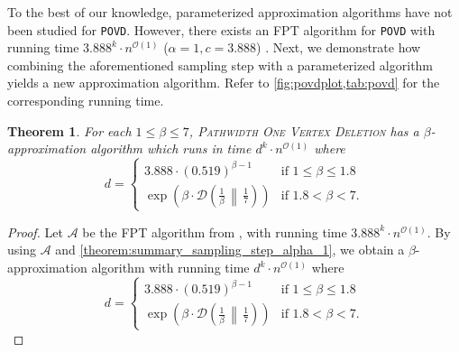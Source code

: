 \documentclass[letterpaper,11pt]{article}
\newcommand{\1}[1]{\mathds{1}\left[#1\right]}
\newcommand{\D}[2]{\mathcal{D}\left(#1\, \middle\|\,#2 \right)}
\newcommand{\Oh}{\mathcal{O}}
\newtheorem{theorem}{Theorem}[section]
\newcommand{\POVD}{\textnormal{\texttt{POVD}}\xspace}
\newcommand{\povd}{\textsc{Pathwidth One Vertex Deletion}\xspace}
\begin{document}
To the best of our knowledge, parameterized approximation algorithms have not been studied for \POVD.
However, there exists an FPT algorithm for \POVD with running time $3.888^{k} \cdot n^{\Oh(1)}$ ($\alpha = 1, c = 3.888$) \cite{tsurFasterAlgorithmPathwidth2022}.
Next, we demonstrate how combining the aforementioned sampling step with a parameterized algorithm yields a new approximation algorithm. Refer to \cref{fig:povdplot,tab:povd} for the corresponding running time.

\begin{theorem}
	For each $1 \leq \beta \leq 7$, \povd has a $\beta$-approximation algorithm
	which runs in time $d^{k} \cdot n^{\Oh(1)}$ where
	\begin{equation}\label{eq:povd_running_time_final}
		d = \begin{cases}
		3.888 \cdot \left(0.519\right)^{\beta - 1} &\text{if } 1 \leq \beta \leq 1.8 \\ 
		\exp\left( \beta \cdot \D{\frac{1}{\beta}}{\frac{1}{7}} \right) &\text{if } 1.8 < \beta < 7.
	\end{cases}
	\end{equation}	
\end{theorem}

\begin{proof}
	Let $\mathcal{A}$ be the FPT algorithm from \cite{tsurFasterAlgorithmPathwidth2022}, with running time $3.888^{k} \cdot n^{\Oh(1)}$.
	By using $\mathcal{A}$ and \cref{theorem:summary_sampling_step_alpha_1}, we obtain a $\beta$-approximation algorithm with running time $d^{k} \cdot n^{\Oh(1)}$ where
	\begin{equation*}
		d = \begin{cases}
		3.888 \cdot \left(0.519\right)^{\beta - 1} &\text{if } 1 \leq \beta \leq 1.8 \\ 
		\exp\left( \beta \cdot \D{\frac{1}{\beta}}{\frac{1}{7}} \right) &\text{if } 1.8 < \beta < 7.
	\end{cases}
	\end{equation*}
\end{proof}
\end{document}
